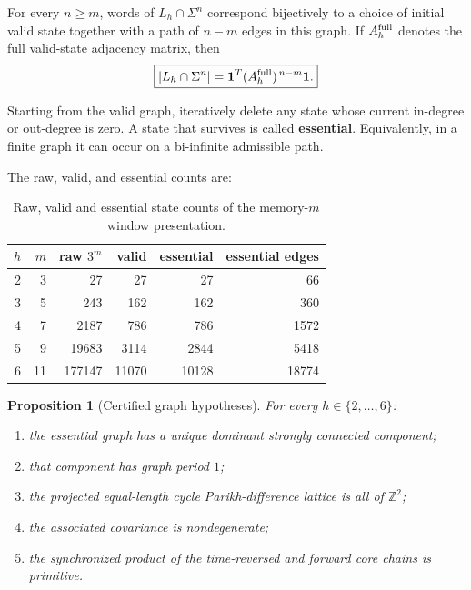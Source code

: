 \documentclass[12pt]{article}
\newtheorem{proposition}[theorem]{Proposition}
\theoremstyle{definition}
\begin{document}
For every \(n\ge m\), words of \(L_h\cap\Sigma^n\) correspond bijectively to a choice of initial valid state together with a path of \(n-m\) edges in this graph. If \(A_h^{\rm full}\) denotes the full valid-state adjacency matrix, then
\begin{equation}\label{eq:pathword}
\boxed{
|L_h\cap\Sigma^n|
=
\mathbf1^T(A_h^{\rm full})^{\,n-m}\mathbf1.
}
\end{equation}

Starting from the valid graph, iteratively delete any state whose current in-degree or out-degree is zero. A state that survives is called \textbf{essential}. Equivalently, in a finite graph it can occur on a bi-infinite admissible path.

The raw, valid, and essential counts are:

\begin{table}[h]
\centering
\begin{tabular}{rrrrrr}
\toprule
\(h\) & \(m\) & raw \(3^m\) & valid & essential & essential edges \\
\midrule
2 & 3 & 27 & 27 & 27 & 66 \\
3 & 5 & 243 & 162 & 162 & 360 \\
4 & 7 & 2187 & 786 & 786 & 1572 \\
5 & 9 & 19683 & 3114 & 2844 & 5418 \\
6 & 11 & 177147 & 11070 & 10128 & 18774 \\
\bottomrule
\end{tabular}
\caption{Raw, valid and essential state counts of the memory-\(m\) window presentation.}
\label{tab:counts}
\end{table}

\begin{proposition}[Certified graph hypotheses]
\label{prop:graph}
For every \(h\in\{2,\ldots,6\}\):
\begin{enumerate}
\item the essential graph has a unique dominant strongly connected component;
\item that component has graph period \(1\);
\item the projected equal-length cycle Parikh-difference lattice is all of \(\mathbb Z^2\);
\item the associated covariance is nondegenerate;
\item the synchronized product of the time-reversed and forward core chains is primitive.
\end{enumerate}
\end{proposition}
\end{document}
